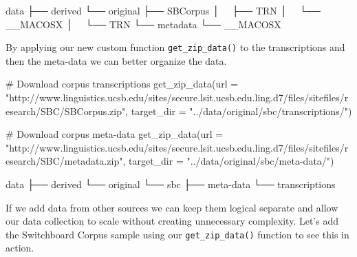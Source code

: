 \documentclass[
  letterpaper,
]{latex/krantz}
\newenvironment{Shaded}{\begin{snugshade}}{\end{snugshade}}
\newcommand{\AttributeTok}[1]{\textcolor[rgb]{0.40,0.45,0.13}{#1}}
\newcommand{\CommentTok}[1]{\textcolor[rgb]{0.37,0.37,0.37}{#1}}
\newcommand{\ExtensionTok}[1]{\textcolor[rgb]{0.00,0.23,0.31}{#1}}
\newcommand{\FunctionTok}[1]{\textcolor[rgb]{0.28,0.35,0.67}{#1}}
\newcommand{\NormalTok}[1]{\textcolor[rgb]{0.00,0.23,0.31}{#1}}
\newcommand{\StringTok}[1]{\textcolor[rgb]{0.13,0.47,0.30}{#1}}
\begin{document}
\begin{Shaded}
\begin{Highlighting}[]
\ExtensionTok{data}
\ExtensionTok{├──}\NormalTok{ derived}
\ExtensionTok{└──}\NormalTok{ original}
    \ExtensionTok{├──}\NormalTok{ SBCorpus}
    \ExtensionTok{│  }\NormalTok{ ├── TRN}
    \ExtensionTok{│  }\NormalTok{ └── \_\_MACOSX}
    \ExtensionTok{│  }\NormalTok{     └── TRN}
    \ExtensionTok{└──}\NormalTok{ metadata}
        \ExtensionTok{└──}\NormalTok{ \_\_MACOSX}
\end{Highlighting}
\end{Shaded}

By applying our new custom function \texttt{get\_zip\_data()} to the
transcriptions and then the meta-data we can better organize the data.

\begin{Shaded}
\begin{Highlighting}[]
\CommentTok{\# Download corpus transcriptions}
\FunctionTok{get\_zip\_data}\NormalTok{(}\AttributeTok{url =} \StringTok{"http://www.linguistics.ucsb.edu/sites/secure.lsit.ucsb.edu.ling.d7/files/sitefiles/research/SBC/SBCorpus.zip"}\NormalTok{, }\AttributeTok{target\_dir =} \StringTok{"../data/original/sbc/transcriptions/"}\NormalTok{)}

\CommentTok{\# Download corpus meta{-}data}
\FunctionTok{get\_zip\_data}\NormalTok{(}\AttributeTok{url =} \StringTok{"http://www.linguistics.ucsb.edu/sites/secure.lsit.ucsb.edu.ling.d7/files/sitefiles/research/SBC/metadata.zip"}\NormalTok{, }\AttributeTok{target\_dir =} \StringTok{"../data/original/sbc/meta{-}data/"}\NormalTok{)}
\end{Highlighting}
\end{Shaded}

\begin{Shaded}
\begin{Highlighting}[]
\ExtensionTok{data}
\ExtensionTok{├──}\NormalTok{ derived}
\ExtensionTok{└──}\NormalTok{ original}
    \ExtensionTok{└──}\NormalTok{ sbc}
        \ExtensionTok{├──}\NormalTok{ meta{-}data}
        \ExtensionTok{└──}\NormalTok{ transcriptions}
\end{Highlighting}
\end{Shaded}

If we add data from other sources we can keep them logical separate and
allow our data collection to scale without creating unnecessary
complexity. Let's add the Switchboard Corpus sample using our
\texttt{get\_zip\_data()} function to see this in action.
\end{document}
